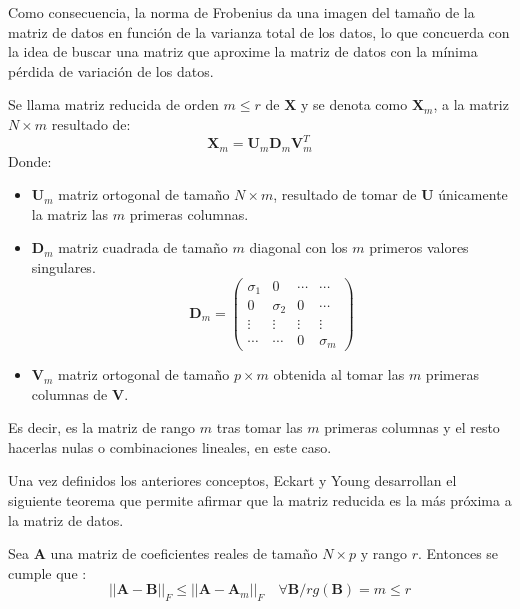 \noindent Como consecuencia, la norma de Frobenius da una imagen del tamaño de la matriz de datos en función de la varianza total de los datos, lo que concuerda con la idea de buscar una matriz que aproxime la matriz de datos con la mínima pérdida de variación de los datos.  

\begin{defi}
Se llama matriz reducida de orden $m\leq r$ de $\textbf{X}$ y se denota como $\textbf{X}_m$, a la matriz $N\times m $ resultado de:
\begin{equation}
\textbf{X}_m=\textbf{U}_m\mathbf{D}_m\textbf{V}^T_m
\end{equation}
Donde:
\begin{itemize}
\item $\textbf{U}_m$ matriz ortogonal de tamaño $N \times m$, resultado de tomar de \textbf{U} únicamente la matriz las $m$ primeras columnas. 
\item $\mathbf{D}_m$  matriz cuadrada de tamaño $m$ diagonal con los $m$ primeros valores singulares. 
\begin{equation}
\mathbf{D}_m=\begin{pmatrix}
\sigma_1 & 0 & \cdots  & \cdots \\
0 & \sigma_2 & 0 & \cdots\\
\vdots & \vdots & \vdots & \vdots\\
\cdots & \cdots & 0 & \sigma_m
\end{pmatrix}
\end{equation}
\item $\textbf{V}_m$ matriz ortogonal de tamaño $p \times m$ obtenida al tomar las $m$ primeras columnas de \textbf{V}.
\end{itemize}
Es decir, es la matriz de rango $m$ tras tomar las  $m$ primeras columnas y el resto hacerlas nulas o combinaciones lineales, en este caso.
\end{defi}

\noindent Una vez definidos los anteriores conceptos, Eckart y Young desarrollan el siguiente teorema que permite afirmar que la matriz reducida es la más próxima a la matriz de datos\cite{Eckart 1936, Golub 1987}.

\begin{teorema}
Sea \textbf{A} una matriz de coeficientes reales de tamaño $N\times p$ y rango $r$. Entonces se cumple que :
\begin{equation}
||\textbf{A}-\textbf{B}||_F\leq ||\textbf{A}-\textbf{A}_m||_F \quad \forall \textbf{B}/ rg(\textbf{B})=m \leq r
\end{equation} 
\end{teorema}

